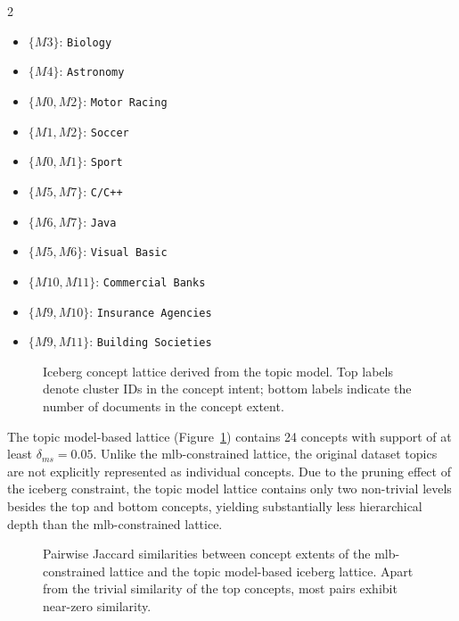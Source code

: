 {\small
\begin{multicols}{2}
\begin{itemize}[leftmargin=*,nosep]
\item $\{M3\}$: \texttt{Biology}
\item $\{M4\}$: \texttt{Astronomy}
\item $\{M0,M2\}$: \texttt{Motor Racing}
\item $\{M1,M2\}$: \texttt{Soccer}
\item $\{M0,M1\}$: \texttt{Sport}
\item $\{M5,M7\}$: \texttt{C/C++}
\item $\{M6,M7\}$: \texttt{Java}
\item $\{M5,M6\}$: \texttt{Visual Basic}
\item $\{M10,M11\}$: \texttt{Commercial Banks}
\item $\{M9,M10\}$: \texttt{Insurance Agencies}
\item $\{M9,M11\}$: \texttt{Building Societies}
\end{itemize}
\end{multicols}
}

\begin{figure}[t]
    \centering
    
    \caption{Iceberg concept lattice derived from the topic model. Top labels denote cluster IDs in the concept intent; bottom labels indicate the number of documents in the concept extent.}
    \label{fig:iceberg_concept_lattice}
\end{figure}

The topic model-based lattice (Figure~\ref{fig:iceberg_concept_lattice}) contains 24 concepts with support of at least $\delta_{ms}=0.05$. 
Unlike the \ac{mlb}-constrained lattice, the original dataset topics are not explicitly represented as individual concepts.
Due to the pruning effect of the iceberg constraint, the topic model lattice contains only two non-trivial levels besides the top and bottom concepts, yielding substantially less hierarchical depth than the \ac{mlb}-constrained lattice.

\begin{figure}[hbt]
    \centering
    
    \caption{Pairwise Jaccard similarities between concept extents of the \ac{mlb}-constrained lattice and the topic model-based iceberg lattice. Apart from the trivial similarity of the top concepts, most pairs exhibit near-zero similarity.}
    \label{fig:concept_lattice_similarity}
\end{figure}

